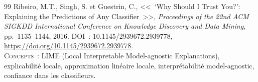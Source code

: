 \documentclass[12pt,a4paper]{article}
\begin{document}
\begin{thebibliography}{99}
Ribeiro, M.T., Singh, S. et Guestrin, C., <<~`Why Should I Trust You?': Explaining the Predictions of Any Classifier~>>, \textit{Proceedings of the 22nd ACM SIGKDD International Conference on Knowledge Discovery and Data Mining}, pp.~1135--1144, 2016. DOI~: 10.1145/2939672.2939778,
\url{https://doi.org/10.1145/2939672.2939778}.
\\[2pt] {\small \textsc{Concepts~:} LIME (Local Interpretable Model-agnostic Explanations), explicabilité locale, approximation linéaire locale, interprétabilité model-agnostic, confiance dans les classifieurs.}

\end{thebibliography}
\end{document}
